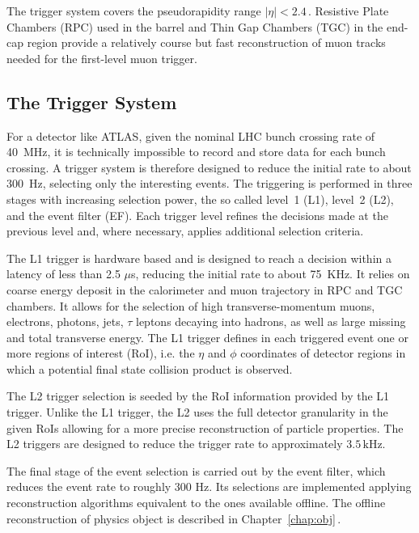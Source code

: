 The trigger system covers the pseudorapidity range $|\eta| < 2.4\,.$ Resistive Plate Chambers
(RPC)  used in the barrel and Thin Gap Chambers (TGC) in the end-cap region
provide a relatively course but fast reconstruction of muon tracks needed  for the first-level muon trigger.


\subsection{The Trigger System}
For a detector like ATLAS, given the nominal LHC  bunch crossing rate of 40~MHz, it is technically impossible to record and store 
data for each bunch crossing. A  trigger system is therefore designed to reduce the initial rate to about 300~Hz, 
selecting only the interesting events. The triggering is performed in three stages with increasing selection power, the
so called  level~1 (L1), level~2 (L2), and the event filter (EF). Each trigger level
refines the decisions made at the previous level and, where necessary, applies additional selection
criteria.

The L1 trigger is hardware based and is designed to reach a decision within a latency of less than 2.5 $\mu$s, reducing the initial
rate to about 75~KHz. It  relies on coarse energy deposit in the calorimeter and muon trajectory in RPC and TGC chambers. It 
allows for the selection of high transverse-momentum muons, electrons, photons, jets, $\tau$ 
leptons decaying into hadrons, as well as large missing and total transverse energy.
The L1 trigger defines in each triggered event one or more regions of interest (RoI), i.e. the $\eta$ and $\phi$ coordinates
of detector regions in which a potential final state collision product is observed. %

The L2 trigger  selection is seeded by the RoI information provided by the L1 trigger. Unlike the L1 trigger,
the L2 uses the full detector granularity in the given RoIs allowing for a more precise reconstruction of particle properties.
The L2 triggers are designed to reduce the trigger rate to approximately $3.5\,\text{kHz}$.

The final stage of the event selection is carried out by the event filter, which reduces
the event rate to roughly 300 Hz. Its selections are implemented 
applying reconstruction algorithms equivalent to the ones available offline. The offline reconstruction of 
physics object is described in Chapter~\ref{chap:obj}$\,$.



